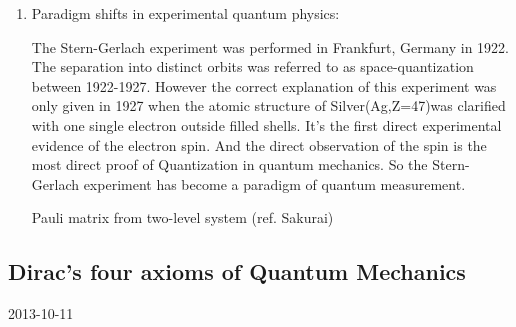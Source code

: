 \documentclass[12pt]{article}
\numberwithin{equation}{section}
\begin{document}
\begin{enumerate}
\item Paradigm shifts in experimental quantum physics: \par
	The Stern-Gerlach experiment was performed in Frankfurt, Germany in 1922. The separation into distinct orbits was referred to as space-quantization between 1922-1927. However the correct explanation of this experiment was only given in 1927 when the atomic structure of Silver(Ag,Z=47)was clarified with one single electron outside filled shells. It's {\color{orange}the first direct experimental evidence of the electron spin}. And the direct observation of the spin is {\color{orange}the most direct proof of Quantization} in quantum mechanics. So the Stern-Gerlach experiment has become a {\color{orange}paradigm of quantum measurement}. \par
	Pauli matrix from two-level system (ref. Sakurai)
\end{enumerate}
\subsection{Dirac's four axioms of Quantum Mechanics}2013-10-11
\end{document}

